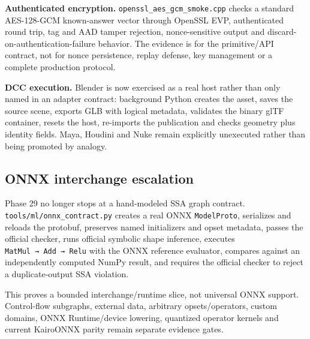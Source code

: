\textbf{Authenticated encryption.} \texttt{openssl\_aes\_gcm\_smoke.cpp} checks a standard AES-128-GCM known-answer vector through OpenSSL EVP, authenticated round trip, tag and AAD tamper rejection, nonce-sensitive output and discard-on-authentication-failure behavior. The evidence is for the primitive/API contract, not for nonce persistence, replay defense, key management or a complete production protocol.

\textbf{DCC execution.} Blender is now exercised as a real host rather than only named in an adapter contract: background Python creates the asset, saves the source scene, exports GLB with logical metadata, validates the binary glTF container, resets the host, re-imports the publication and checks geometry plus identity fields. Maya, Houdini and Nuke remain explicitly unexecuted rather than being promoted by analogy.

\subsection{ONNX interchange escalation}\label{appendix-2358b21a702d-onnx-interchange-escalation}

Phase 29 no longer stops at a hand-modeled SSA graph contract. \texttt{tools/ml/onnx\_contract.py} creates a real ONNX \texttt{ModelProto}, serializes and reloads the protobuf, preserves named initializers and opset metadata, passes the official checker, runs official symbolic shape inference, executes \texttt{MatMul\ →\ Add\ →\ Relu} with the ONNX reference evaluator, compares against an independently computed NumPy result, and requires the official checker to reject a duplicate-output SSA violation.

This proves a bounded interchange/runtime slice, not universal ONNX support. Control-flow subgraphs, external data, arbitrary opsets/operators, custom domains, ONNX Runtime/device lowering, quantized operator kernels and current KairoONNX parity remain separate evidence gates.
